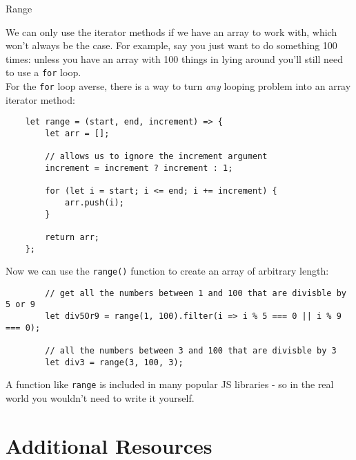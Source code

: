 \begin{infobox}{Range}

    We can only use the iterator methods if we have an array to work with, which won't always be the case. For example, say you just want to do something 100 times: unless you have an array with 100 things in lying around you'll still need to use a \texttt{for} loop.
    \\

    For the \texttt{for} loop averse, there is a way to turn \textit{any} looping problem into an array iterator method:

    \begin{verbatim}
    let range = (start, end, increment) => {
        let arr = [];

        // allows us to ignore the increment argument
        increment = increment ? increment : 1;

        for (let i = start; i <= end; i += increment) {
            arr.push(i);
        }

        return arr;
    };
    \end{verbatim}

    Now we can use the \texttt{range()} function to create an array of arbitrary length:

    \begin{verbatim}
        // get all the numbers between 1 and 100 that are divisble by 5 or 9
        let div5Or9 = range(1, 100).filter(i => i % 5 === 0 || i % 9 === 0);

        // all the numbers between 3 and 100 that are divisble by 3
        let div3 = range(3, 100, 3);
    \end{verbatim}

    A function like \texttt{range} is included in many popular JS libraries - so in the real world you wouldn't need to write it yourself.
\end{infobox}

\pagebreak

\section{Additional Resources}

